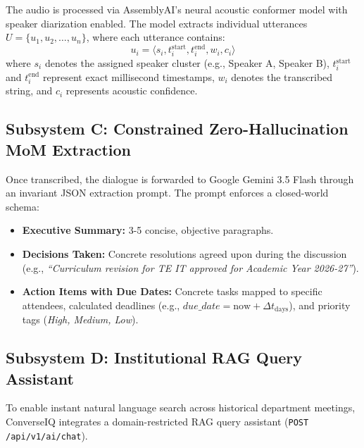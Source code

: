 \documentclass[conference]{IEEEtran}
\begin{document}
The audio is processed via AssemblyAI's neural acoustic conformer model with speaker diarization enabled. The model extracts individual utterances $U = \{u_1, u_2, \dots, u_n\}$, where each utterance contains:
\begin{equation}
u_i = \langle s_i, t^{\text{start}}_i, t^{\text{end}}_i, w_i, c_i \rangle
\end{equation}
where $s_i$ denotes the assigned speaker cluster (e.g., Speaker A, Speaker B), $t^{\text{start}}_i$ and $t^{\text{end}}_i$ represent exact millisecond timestamps, $w_i$ denotes the transcribed string, and $c_i$ represents acoustic confidence.

\subsection{Subsystem C: Constrained Zero-Hallucination MoM Extraction}
Once transcribed, the dialogue is forwarded to Google Gemini 3.5 Flash through an invariant JSON extraction prompt. The prompt enforces a closed-world schema:
\begin{itemize}
    \item \textbf{Executive Summary:} 3-5 concise, objective paragraphs.
    \item \textbf{Decisions Taken:} Concrete resolutions agreed upon during the discussion (e.g., \textit{``Curriculum revision for TE IT approved for Academic Year 2026-27''}).
    \item \textbf{Action Items with Due Dates:} Concrete tasks mapped to specific attendees, calculated deadlines (e.g., $due\_date = \text{now} + \Delta t_{\text{days}}$), and priority tags (\textit{High, Medium, Low}).
\end{itemize}

\subsection{Subsystem D: Institutional RAG Query Assistant}
To enable instant natural language search across historical department meetings, ConverseIQ integrates a domain-restricted RAG query assistant (\texttt{POST /api/v1/ai/chat}). 
\end{document}
